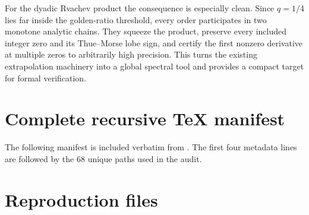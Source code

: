\documentclass[11pt,oneside]{article}
\numberwithin{equation}{section}
\theoremstyle{frontier}
\theoremstyle{definition}
\theoremstyle{remark}
\begin{document}
For the dyadic Rvachev product the consequence is especially clean.  Since $q=1/4$ lies far
inside the golden-ratio threshold, every order participates in two monotone analytic chains.
They squeeze the product, preserve every included integer zero and its Thue--Morse lobe sign,
and certify the first nonzero derivative at multiple zeros to arbitrarily high precision.
This turns the existing extrapolation machinery into a global spectral tool and provides a
compact target for formal verification.

\appendix

\section{Complete recursive TeX manifest}\label{app:manifest}

The following manifest is included verbatim from .  The first four
metadata lines are followed by the 68 unique paths used in the audit.



\section{Reproduction files}\label{app:files}
\end{document}
